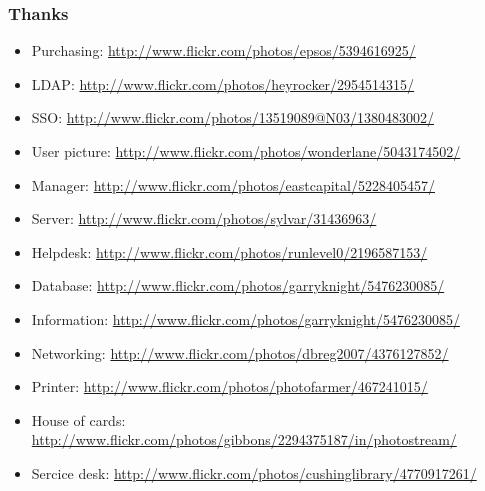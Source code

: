 \documentclass{beamer}
\begin{document}
\begin{frame}
    \frametitle{Thanks}

        \begin{itemize}
                \item Purchasing: \url{http://www.flickr.com/photos/epsos/5394616925/}
                \item LDAP: \url{http://www.flickr.com/photos/heyrocker/2954514315/}
                \item SSO: \url{http://www.flickr.com/photos/13519089@N03/1380483002/}
                \item User picture: \url{http://www.flickr.com/photos/wonderlane/5043174502/}
                \item Manager: \url{http://www.flickr.com/photos/eastcapital/5228405457/}
                \item Server: \url{http://www.flickr.com/photos/sylvar/31436963/}
                \item Helpdesk: \url{http://www.flickr.com/photos/runlevel0/2196587153/}
                \item Database: \url{http://www.flickr.com/photos/garryknight/5476230085/}
                \item Information: \url{http://www.flickr.com/photos/garryknight/5476230085/}
                \item Networking: \url{http://www.flickr.com/photos/dbreg2007/4376127852/}
                \item Printer: \url{http://www.flickr.com/photos/photofarmer/467241015/}
                \item House of cards: \url{http://www.flickr.com/photos/gibbons/2294375187/in/photostream/}
                \item Sercice desk: \url{http://www.flickr.com/photos/cushinglibrary/4770917261/}
        \end{itemize}

\end{frame}
\end{document}

